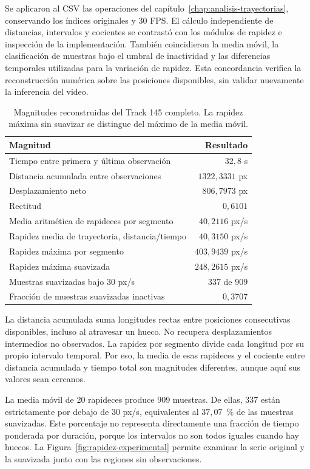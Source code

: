 Se aplicaron al CSV las operaciones del capítulo~\ref{chap:analisis-trayectorias}, conservando los índices originales y 30 FPS. El cálculo independiente de distancias, intervalos y cocientes se contrastó con los módulos de rapidez e inspección de la implementación. También coincidieron la media móvil, la clasificación de muestras bajo el umbral de inactividad y las diferencias temporales utilizadas para la variación de rapidez. Esta concordancia verifica la reconstrucción numérica sobre las posiciones disponibles, sin validar nuevamente la inferencia del video.

\begin{table}[htbp]
 \centering
 \caption{Magnitudes reconstruidas del Track 145 completo. La rapidez máxima sin suavizar se distingue del máximo de la media móvil.}
 \label{tab:movimiento-experimental}
 \begin{tabular}{@{}lr@{}}
  \toprule
  Magnitud & Resultado \\
  \midrule
  Tiempo entre primera y última observación & $32{,}8$ s \\
  Distancia acumulada entre observaciones & $1322{,}3331$ px \\
  Desplazamiento neto & $806{,}7973$ px \\
  Rectitud & $0{,}6101$ \\
  Media aritmética de rapideces por segmento & $40{,}2116$ px/s \\
  Rapidez media de trayectoria, distancia/tiempo & $40{,}3150$ px/s \\
  Rapidez máxima por segmento & $403{,}9439$ px/s \\
  Rapidez máxima suavizada & $248{,}2615$ px/s \\
  Muestras suavizadas bajo 30 px/s & $337$ de $909$ \\
  Fracción de muestras suavizadas inactivas & $0{,}3707$ \\
  \bottomrule
 \end{tabular}
\end{table}

La distancia acumulada suma longitudes rectas entre posiciones consecutivas disponibles, incluso al atravesar un hueco. No recupera desplazamientos intermedios no observados. La rapidez por segmento divide cada longitud por su propio intervalo temporal. Por eso, la media de esas rapideces y el cociente entre distancia acumulada y tiempo total son magnitudes diferentes, aunque aquí sus valores sean cercanos.

La media móvil de 20 rapideces produce 909 muestras. De ellas, 337 están estrictamente por debajo de 30 px/s, equivalentes al $37{,}07$~\% de las muestras suavizadas. Este porcentaje no representa directamente una fracción de tiempo ponderada por duración, porque los intervalos no son todos iguales cuando hay huecos. La Figura~\ref{fig:rapidez-experimental} permite examinar la serie original y la suavizada junto con las regiones sin observaciones.

